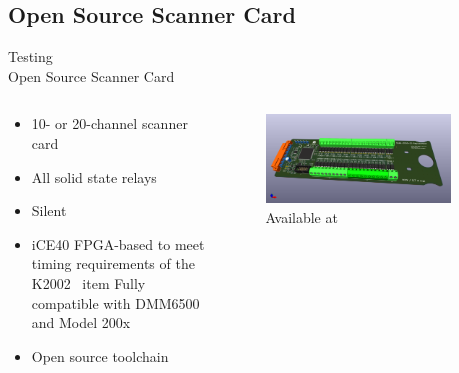 \documentclass[color={accentcolor=1b}, authorontitle=true]{tudabeamer}
\begin{document}
\subsection{Open Source Scanner Card}
\begin{frame}{Testing \\\textnormal{\small{Open Source Scanner Card}}}
    \begin{columns}[T] %
        \begin{column}{.48\textwidth}
            \begin{itemize}
                \item 10- or 20-channel scanner card
                \item All solid state relays
                \item Silent
                \item iCE40 FPGA-based to meet timing requirements of the K2002
                \ item Fully compatible with DMM6500 and Model 200x
                \item Open source toolchain
            \end{itemize}

        \end{column}
        \hfill
        \begin{column}{.48\textwidth}
            \begin{figure}[h]
                \includegraphics[width=0.9\textwidth]{images/scanner_card.png}
                \caption{Available at \cite{scan2000}}
            \end{figure}
        \end{column}
    \end{columns}
\end{frame}
\end{document}
